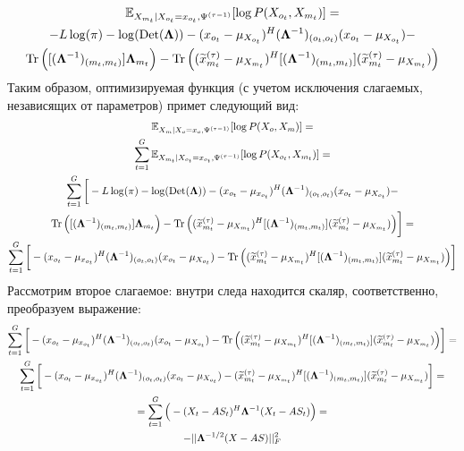 \documentclass[11pt]{article}
\newcommand{\Expect}{\mathbb{E}}
\DeclareMathOperator{\Det}{Det}
\begin{document}
\begin{equation*}
\begin{gathered}
\Expect_{X_{m_t}|X_{o_t}=x_{o_t}, \Psi^{(\tau-1)}}[\log P(X_{o_t}, X_{m_t})]=\\
-L \log(\pi) - \log (\Det(\mathbf{\Lambda})) - (x_{o_t}-\mu_{X_{o_t}})^H (\mathbf{\Lambda}^{-1})_{(o_t, o_t)}(x_{o_t}-\mu_{X_{o_t}}) -  \\ \Tr \Big( [(\mathbf{\Lambda}^{-1})_{(m_t, m_t)}]\mathbf{\Lambda}_{m_t} \Big) - \Tr \Big((\widetilde{x}_{m_t}^{(\tau)} - \mu_{X_{m_t}})^H[(\mathbf{\Lambda}^{-1})_{(m_t, m_t)}](\widetilde{x}_{m_t}^{(\tau)} - \mu_{X_{m_t}}) \Big) 
\end{gathered}
\end{equation*}
Таким образом, оптимизируемая функция (с учетом исключения слагаемых, независящих от параметров) примет следующий вид:
\begin{equation*}
\begin{gathered}
 \Expect_{X_m|X_o=x_o, \Psi^{(\tau-1)}}[\log P(X_o, X_m)] = \\
 \sum_{t=1}^G\Expect_{X_{m_t}|X_{o_t}=x_{o_t}, \Psi^{(\tau-1)}}[\log P(X_{o_t}, X_{m_t})] = \\
\sum_{t=1}^G \bigg[ -L \log(\pi) - \log (\Det(\mathbf{\Lambda})) - (x_{o_t}-\mu_{x_{o_t}}) ^H (\mathbf{\Lambda}^{-1})_{(o_t, o_t)}(x_{o_t}-\mu_{X_{o_t}})  -  \\ \Tr \Big( [(\mathbf{\Lambda}^{-1})_{(m_t, m_t)}]\mathbf{\Lambda}_{m_t} \Big) - \Tr \Big((\widetilde{x}_{m_t}^{(\tau)} - \mu_{X_{m_t}})^H[(\mathbf{\Lambda}^{-1})_{(m_t, m_t)}](\widetilde{x}_{m_t}^{(\tau)} - \mu_{X_{m_t}}) \Big)  \bigg] =\\
\sum_{t=1}^G \bigg[- (x_{o_t}-\mu_{x_{o_t}}) ^H (\mathbf{\Lambda}^{-1})_{(o_t, o_t)}(x_{o_t}-\mu_{X_{o_t}})  - \Tr \Big((\widetilde{x}_{m_t}^{(\tau)} - \mu_{X_{m_t}})^H[(\mathbf{\Lambda}^{-1})_{(m_t, m_t)}](\widetilde{x}_{m_t}^{(\tau)} - \mu_{X_{m_t}}) \Big)  \bigg]
\end{gathered}
\end{equation*}
Рассмотрим второе слагаемое: внутри следа находится скаляр, соответственно, преобразуем выражение:
\begin{equation*}
\begin{gathered}
\sum_{t=1}^G \bigg[- (x_{o_t}-\mu_{x_{o_t}}) ^H (\mathbf{\Lambda}^{-1})_{(o_t, o_t)}(x_{o_t}-\mu_{X_{o_t}})  - \Tr \Big((\widetilde{x}_{m_t}^{(\tau)} - \mu_{X_{m_t}})^H[(\mathbf{\Lambda}^{-1})_{(m_t, m_t)}](\widetilde{x}_{m_t}^{(\tau)} - \mu_{X_{m_t}}) \Big)  \bigg] = \\
\sum_{t=1}^G \bigg[- (x_{o_t}-\mu_{x_{o_t}}) ^H (\mathbf{\Lambda}^{-1})_{(o_t, o_t)}(x_{o_t}-\mu_{X_{o_t}})  - (\widetilde{x}_{m_t}^{(\tau)} - \mu_{X_{m_t}})^H[(\mathbf{\Lambda}^{-1})_{(m_t, m_t)}](\widetilde{x}_{m_t}^{(\tau)} - \mu_{X_{m_t}})  \bigg] = \\
= \sum_{t=1}^G \Big( - (X_t-AS_t)^H \mathbf{\Lambda}^{-1}(X_t-AS_t) \Big) = \\
- ||\mathbf{\Lambda}^{-1/2}(X-AS)||_F^2
\end{gathered}
\end{equation*}
\end{document}
